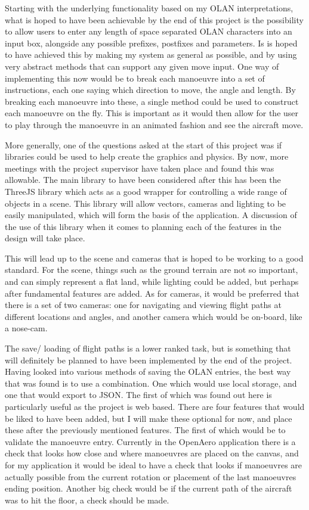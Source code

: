 Starting with the underlying functionality based on my OLAN interpretations, what is hoped to have been achievable by the end of this project is the possibility to allow users to enter any length of space separated OLAN characters into an input box, alongside any possible prefixes, postfixes and parameters. Is is hoped to have achieved this by making my system as general as possible, and by using very abstract methods that can support any given move input. One way of implementing this now would be to break each manoeuvre into a set of instructions, each one saying which direction to move, the angle and length. By breaking each manoeuvre into these, a single method could be used to construct each manoeuvre on the fly. This is important as it would then allow for the user to play through the manoeuvre in an animated fashion and see the aircraft move.

More generally, one of the questions asked at the start of this project was if libraries could be used to help create the graphics and physics. By now, more meetings with the project supervisor have taken place and found this was allowable. The main library to have been considered after this has been the ThreeJS\cite{ThreeJs} library which acts as a good wrapper for controlling a wide range of objects in a scene. This library will allow vectors, cameras and lighting to be easily manipulated, which will form the basis of the application. A discussion of the use of this library when it comes to planning each of the features in the design will take place.

This will lead up to the scene and cameras that is hoped to be working to a good standard. For the scene, things such as the ground terrain are not so important, and can simply represent a flat land, while lighting could be added, but perhaps after fundamental features are added. As for cameras, it would be preferred that there is a set of two cameras: one for navigating and viewing flight paths at different locations and angles, and another camera which would be on-board, like a nose-cam.

The save/ loading of flight paths is a lower ranked task, but is something that will definitely be planned to have been implemented by the end of the project. Having looked into various methods of saving the OLAN entries, the best way that was found is to use a combination. One which would use local storage, and one that would export to JSON. The first of which was found out here\cite{Local_Storage} is particularly useful as the project is web based.
There are four features that would be liked to have been added, but I will make these optional for now, and place these after the previously mentioned features. The first of which would be to validate the manoeuvre entry. Currently in the OpenAero application there is a check that looks how close and where manoeuvres are placed on the canvas, and for my application it would be ideal to have a check that looks if manoeuvres are actually possible from the current rotation or placement of the last manoeuvres ending position. Another big check would be if the current path of the aircraft was to hit the floor, a check should be made.

